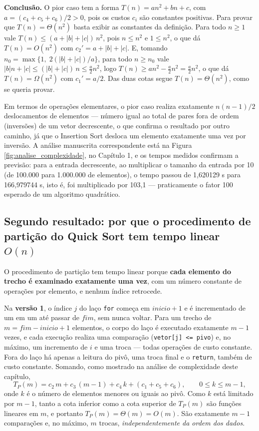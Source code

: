 \qquad \textbf{Conclusão.} O pior caso tem a forma
$T(n) = a n^2 + b n + c$, com
$a = (c_4+c_5+c_6)/2 > 0$, pois os custos $c_i$ são constantes
positivas. Para provar que $T(n) = \Theta(n^2)$ basta exibir as
constantes da definição. Para todo $n \ge 1$ vale
$T(n) \le (a + |b| + |c|)\,n^2$, pois $n \le n^2$ e $1 \le n^2$, o que
dá $T(n) = O(n^2)$ com $c_2' = a+|b|+|c|$. E, tomando
$n_0 = \max\{1,\; 2(|b|+|c|)/a\}$, para todo $n \ge n_0$ vale
$|b|n + |c| \le (|b|+|c|)\,n \le \tfrac{a}{2}n^2$, logo
$T(n) \ge a n^2 - \tfrac{a}{2} n^2 = \tfrac{a}{2} n^2$, o que dá
$T(n) = \Omega(n^2)$ com $c_1' = a/2$. Das duas cotas segue
$T(n) = \Theta(n^2)$, como se queria provar.

\qquad Em termos de operações elementares, o pior caso realiza
exatamente $n(n-1)/2$ deslocamentos de elementos --- número igual ao
total de pares fora de ordem (inversões) de um vetor decrescente, o que
confirma o resultado por outro caminho, já que o Insertion Sort
desloca um elemento exatamente uma vez por inversão. A análise
manuscrita correspondente está na Figura
\ref{fig:analise_complexidade}, no Capítulo 1, e os tempos medidos
confirmam a previsão: para a entrada decrescente, ao multiplicar o
tamanho da entrada por 10 (de 100.000 para 1.000.000 de elementos), o
tempo passou de 1,620129 s para 166,979744 s, isto é, foi multiplicado
por 103,1 --- praticamente o fator 100 esperado de um algoritmo
quadrático.

\subsection{Segundo resultado: por que o procedimento de partição do Quick Sort tem tempo linear $O(n)$}

\qquad O procedimento de partição tem tempo linear porque
\textbf{cada elemento do trecho é examinado exatamente uma vez}, com
um número constante de operações por elemento, e nenhum índice
retrocede.

\qquad Na \textbf{versão 1}, o índice $j$ do laço \texttt{for} começa em
$inicio+1$ e é incrementado de um em um até passar de $fim$, sem
nunca voltar. Para um trecho de $m = fim - inicio + 1$ elementos, o
corpo do laço é executado exatamente $m-1$ vezes, e cada execução
realiza uma comparação (\texttt{vetor[j] <= pivo}) e, no máximo, um
incremento de $i$ e uma troca --- todas operações de custo constante.
Fora do laço há apenas a leitura do pivô, uma troca final e o
\texttt{return}, também de custo constante. Somando, como mostrado na
análise de complexidade deste capítulo,
\[
T_P(m) = c_2\,m + c_3\,(m-1) + c_4\,k + (c_1+c_5+c_6),
\qquad 0 \le k \le m-1,
\]
onde $k$ é o número de elementos menores ou iguais ao pivô. Como $k$
está limitado por $m-1$, tanto a cota inferior como a cota superior de
$T_P(m)$ são funções lineares em $m$, e portanto
$T_P(m) = \Theta(m) = O(m)$. São exatamente $m-1$ comparações e, no
máximo, $m$ trocas, \textit{independentemente da ordem dos dados}.

